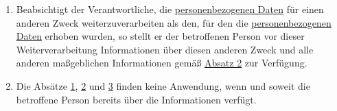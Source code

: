 \begin{enumerate}
\begin{enumerate}
  \end{enumerate}

  \item Beabsichtigt der Verantwortliche, die \hyperref[itm:04-1]{personenbezogenen Daten} für einen anderen Zweck weiterzuverarbeiten als
   den, für den die \hyperref[itm:04-1]{personenbezogenen Daten} erhoben wurden, so stellt er der betroffenen Person vor dieser
   Weiterverarbeitung Informationen über diesen anderen Zweck und alle anderen maßgeblichen Informationen gemäß
   \hyperref[itm:13-2]{Absatz 2} zur Verfügung.
  \label{itm:13-3}  

  \item Die Absätze \hyperref[itm:13-1]{1}, \hyperref[itm:13-2]{2} und \hyperref[itm:13-3]{3} finden keine Anwendung,
   wenn und soweit die betroffene Person bereits über die Informationen verfügt.
  \label{itm:13-4}  

\end{enumerate}


